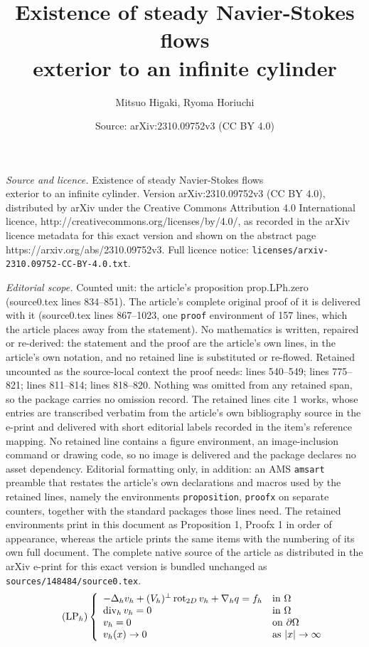 \documentclass[10pt,a4paper]{amsart}
\title{Existence of steady Navier-Stokes flows \\ exterior to an infinite cylinder}
\author{Mitsuo Higaki, Ryoma Horiuchi}
\date{Source: arXiv:2310.09752v3 (CC BY 4.0)}
\newcommand{\h}{{\rm h}}
\newcommand{\opdiv}{\operatorname{div}}
\newcommand{\oprot}{\operatorname{rot}}
\begin{document}
\maketitle

\noindent\emph{Source and licence.} Existence of steady Navier-Stokes flows \\ exterior to an infinite cylinder. Version arXiv:2310.09752v3 (CC BY 4.0), distributed by arXiv under the Creative Commons Attribution 4.0 International licence, http://creativecommons.org/licenses/by/4.0/, as recorded in the arXiv licence metadata for this exact version and shown on the abstract page https://arxiv.org/abs/2310.09752v3. Full licence notice: \texttt{licenses/arxiv-2310.09752-CC-BY-4.0.txt}.\par\smallskip

\noindent\textit{Editorial scope.} Counted unit: the article's proposition prop.LPh.zero (source0.tex lines 834--851). The article's complete original proof of it is delivered with it (source0.tex lines 867--1023, one \texttt{proof} environment of 157 lines, which the article places away from the statement). No mathematics is written, repaired or re-derived: the statement and the proof are the article's own lines, in the article's own notation, and no retained line is substituted or re-flowed.  Retained uncounted as the source-local context the proof needs: lines 540--549; lines 775--821; lines 811--814; lines 818--820.  Nothing was omitted from any retained span, so the package carries no omission record.  The retained lines cite 1 works, whose entries are transcribed verbatim from the article's own bibliography source in the e-print and delivered with short editorial labels recorded in the item's reference mapping.  No retained line contains a figure environment, an image-inclusion command or drawing code, so no image is delivered and the package declares no asset dependency.  Editorial formatting only, in addition: an AMS \texttt{amsart} preamble that restates the article's own declarations and macros used by the retained lines, namely the environments \texttt{proposition}, \texttt{proofx} on separate counters, together with the standard packages those lines need.  The retained environments print in this document as Proposition 1, Proofx 1 in order of appearance, whereas the article prints the same items with the numbering of its own full document.  The complete native source of the article as distributed in the arXiv e-print for this exact version is bundled unchanged as \texttt{sources/148484/source0.tex}.
\begin{equation}\tag{LP$_\h$}\label{eq.LPh}
\left\{
\begin{array}{ll}
-\Delta_\h v_\h + (V_\h)^\bot \oprot_{{\rm 2D}} v_\h + \nabla_\h q 
= f_\h&\mbox{in}\ \Omega \\
\opdiv_\h v_\h = 0&\mbox{in}\ \Omega \\
v_\h = 0 &\mbox{on}\ \partial\Omega \\
v_\h(x)\to0&\mbox{as}\ |x|\to\infty 
\end{array}\right.
\end{equation}
\end{document}
